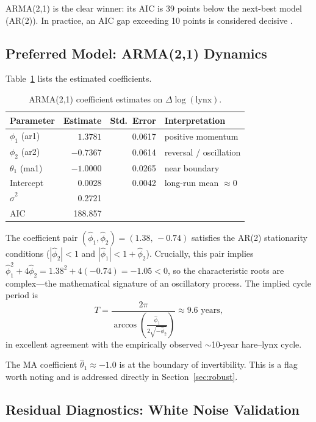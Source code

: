 \documentclass[12pt,a4paper]{article}
\begin{document}
\noindent ARMA(2,1) is the clear winner: its AIC is 39 points below the next-best
model (AR(2)). In practice, an AIC gap exceeding 10 points is considered decisive
\citep{burnham2004multimodel}.

\subsection{Preferred Model: ARMA(2,1) Dynamics}
\label{sec:arma21}

Table~\ref{tab:arma21} lists the estimated coefficients.

\begin{table}[H]
\centering
\caption{ARMA(2,1) coefficient estimates on $\Delta\log(\text{lynx})$.}
\label{tab:arma21}
\begin{tabular}{lrrl}
\toprule
Parameter & Estimate & Std.\ Error & Interpretation \\
\midrule
$\phi_1$ (ar1) & $\phantom{-}1.3781$ & 0.0617 & positive momentum \\
$\phi_2$ (ar2) & $-0.7367$           & 0.0614 & reversal / oscillation \\
$\theta_1$ (ma1) & $-1.0000$         & 0.0265 & near boundary \\
Intercept      & $\phantom{-}0.0028$ & 0.0042 & long-run mean $\approx 0$ \\
\midrule
$\hat{\sigma}^2$ & 0.2721 & & \\
AIC              & 188.857 & & \\
\bottomrule
\end{tabular}
\end{table}

The coefficient pair $(\hat{\phi}_1, \hat{\phi}_2) = (1.38,\,-0.74)$ satisfies the
AR(2) stationarity conditions ($|\hat{\phi}_2| < 1$ and
$|\hat{\phi}_1| < 1 + \hat{\phi}_2$). Crucially, this pair implies
$\hat{\phi}_1^2 + 4\hat{\phi}_2 = 1.38^2 + 4(-0.74) = -1.05 < 0$, so the
characteristic roots are complex---the mathematical signature of an oscillatory
process. The implied cycle period is
\[
  T = \frac{2\pi}{\arccos\!\left(\frac{\hat{\phi}_1}{2\sqrt{-\hat{\phi}_2}}\right)}
    \approx 9.6 \text{ years},
\]
in excellent agreement with the empirically observed $\sim$10-year hare--lynx cycle.

The MA coefficient $\hat{\theta}_1 \approx -1.0$ is at the boundary of invertibility.
This is a flag worth noting and is addressed directly in Section~\ref{sec:robust}.

\subsection{Residual Diagnostics: White Noise Validation}
\end{document}
